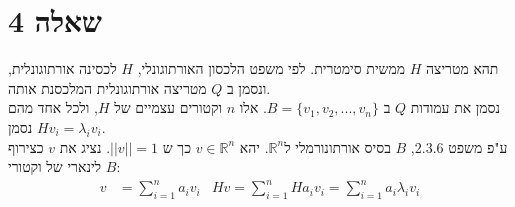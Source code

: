 \documentclass{article}
\def\reals{\mathbb{R}}
\begin{document}
\pagebreak

\section*{שאלה 4}

תהא מטריצה $H$ ממשית סימטרית. לפי משפט הלכסון האורתוגונלי, $H$ לכסינה אורתוגונלית, ונסמן ב $Q$ מטריצה אורתוגונלית המלכסנת אותה.\\
נסמן את עמודות $Q$ ב $B=\{v_1, v_2, ..., v_n\}$. אלו $n$ וקטורים עצמיים של $H$, ולכל אחד מהם נסמן $Hv_i=\lambda_iv_i$. \\
ע"פ משפט 2.3.6, $B$ בסיס אורתונורמלי ל$\reals^n$. יהא $v\in \reals^n$ כך ש $||v||=1$. נציג את $v$ כצירוף לינארי של וקטורי $B$:
\begin{align*}
    v & =\sum_{i=1}^{n}a_iv_i & Hv =\sum_{i=1}^{n} Ha_iv_i = \sum_{i=1}^{n} a_i \lambda_i v_i
\end{align*}
\end{document}
